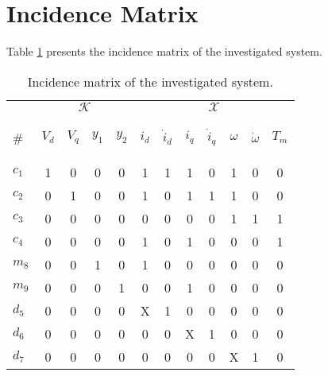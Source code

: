 \documentclass[a4,11pt]{article}
\begin{document}
\section{Incidence Matrix}
Table \ref{tab:matrix} presents the incidence matrix of the investigated system.\setlength\tabcolsep{2mm}

\begin{table}[!htb]
\centering
\normalsize
\begin{tabular}{|l|cccc|ccccccc|}
\hline
&\multicolumn{4}{c|}{$\mathcal{K}$} & \multicolumn{7}{|c|}{$\mathcal{X}$}\\
\cline{2-12}
\# & \begin{sideways}$V_d$\end{sideways}& \begin{sideways}$V_q$\end{sideways}& \begin{sideways}$y_1$\end{sideways}& \begin{sideways}$y_2$\end{sideways}& \begin{sideways}$i_d$\end{sideways}& \begin{sideways}$\dot{i}_d$\end{sideways}& \begin{sideways}$i_q$\end{sideways}& \begin{sideways}$\dot{i}_q$\end{sideways}& \begin{sideways}$\omega$\end{sideways}& \begin{sideways}$\dot{\omega}$\end{sideways}& \begin{sideways}$T_m$\end{sideways} \\ 
\hline
$c_1$  & 1 & 0 & 0 & 0 & 1 & 1 & 1 & 0 & 1 & 0 & 0 \\ 
$c_2$  & 0 & 1 & 0 & 0 & 1 & 0 & 1 & 1 & 1 & 0 & 0 \\ 
$c_3$  & 0 & 0 & 0 & 0 & 0 & 0 & 0 & 0 & 1 & 1 & 1 \\ 
$c_4$  & 0 & 0 & 0 & 0 & 1 & 0 & 1 & 0 & 0 & 0 & 1 \\ 
$m_8$  & 0 & 0 & 1 & 0 & 1 & 0 & 0 & 0 & 0 & 0 & 0 \\ 
$m_9$  & 0 & 0 & 0 & 1 & 0 & 0 & 1 & 0 & 0 & 0 & 0 \\ 
\hline
$d_5$  & 0 & 0 & 0 & 0 & X & 1 & 0 & 0 & 0 & 0 & 0 \\ 
$d_6$  & 0 & 0 & 0 & 0 & 0 & 0 & X & 1 & 0 & 0 & 0 \\ 
$d_7$  & 0 & 0 & 0 & 0 & 0 & 0 & 0 & 0 & X & 1 & 0 \\ \hline
\end{tabular}
\caption{Incidence matrix of the investigated system.}
\label{tab:matrix}
\end{table}
\newpage
\end{document}
